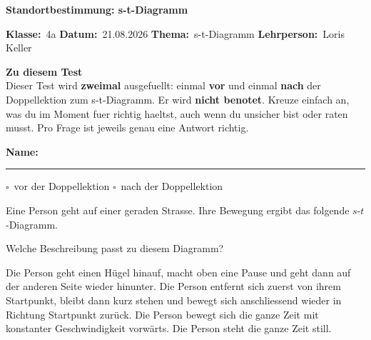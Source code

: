 \documentclass[11pt,a4paper]{exam}
\newcommand{\Kopfzeile}[4]{%
  \begin{titlebox}
    {\color{white}\sffamily\bfseries\Large #4}
  \end{titlebox}
  \noindent\textbf{Klasse:}~#1 \hfill \textbf{Datum:}~#2 \hfill \textbf{Thema:}~#3
    \hfill \textbf{Lehrperson:}~Loris Keller
  \lhead{\textcolor{darkgray}{#3}}
  \rhead{\textcolor{darkgray}{#4}}
}
\newcommand{\Klasse}{4a}
\newcommand{\Datum}{21.08.2026}
\newcommand{\Thema}{s-t-Diagramm}
\newcommand{\ArbeitsblattTitel}{Standortbestimmung: s-t-Diagramm}
\begin{document}
\Kopfzeile{\Klasse}{\Datum}{\Thema}{\ArbeitsblattTitel}

\begin{infobox}
\textbf{Zu diesem Test}\\
Dieser Test wird \textbf{zweimal} ausgefuellt: einmal \textbf{vor} und einmal
\textbf{nach} der Doppellektion zum s-t-Diagramm. Er wird \textbf{nicht
benotet}. Kreuze einfach an, was du im Moment fuer richtig haeltst, auch
wenn du unsicher bist oder raten musst. Pro Frage ist jeweils genau eine
Antwort richtig.

\medskip
\textbf{Name:}~\rule{5cm}{0.4pt} \hfill
$\square$~vor der Doppellektion \hfill $\square$~nach der Doppellektion
\end{infobox}

\begin{questions}

\question Eine Person geht auf einer geraden Strasse. Ihre Bewegung ergibt
das folgende $s$-$t$-Diagramm.
\begin{center}
\end{center}
Welche Beschreibung passt zu diesem Diagramm?
\begin{choices}
  \choice Die Person geht einen Hügel hinauf, macht oben eine Pause und
  geht dann auf der anderen Seite wieder hinunter.
  \CorrectChoice Die Person entfernt sich zuerst von ihrem Startpunkt,
  bleibt dann kurz stehen und bewegt sich anschliessend wieder in Richtung
  Startpunkt zurück.
  \choice Die Person bewegt sich die ganze Zeit mit konstanter
  Geschwindigkeit vorwärts.
  \choice Die Person steht die ganze Zeit still.
\end{choices}


\end{questions}
\end{document}
